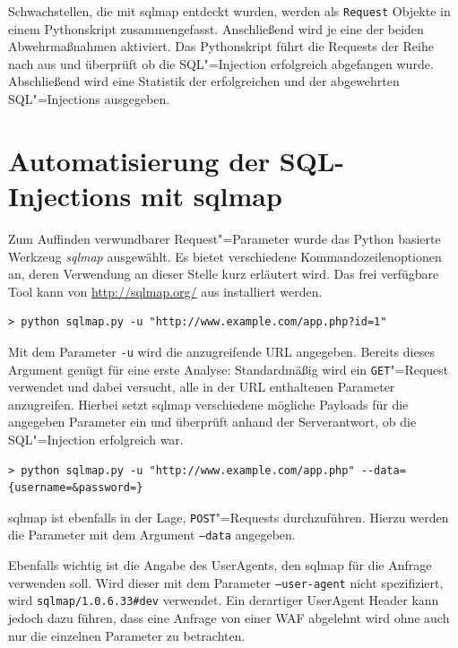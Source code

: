 Schwachstellen, die mit sqlmap entdeckt wurden, werden als \texttt{Request} Objekte in einem Pythonskript zusammengefasst. Anschließend wird je eine der beiden Abwehrmaßnahmen aktiviert. Das Pythonskript führt die Requests der Reihe nach aus und überprüft ob die SQL"=Injection erfolgreich abgefangen wurde. Abschließend wird eine Statistik der erfolgreichen und der abgewehrten SQL"=Injections ausgegeben.


\section{Automatisierung der SQL-Injections mit sqlmap}

Zum Auffinden verwundbarer Request"=Parameter wurde das Python basierte Werkzeug \emph{sqlmap} ausgewählt. Es bietet verschiedene Kommandozeilenoptionen an, deren Verwendung an dieser Stelle kurz erläutert wird. Das frei verfügbare Tool kann von \url{http://sqlmap.org/} aus installiert werden.

\begin{listing}
\begin{verbatim}
> python sqlmap.py -u "http://www.example.com/app.php?id=1"
\end{verbatim}
\end{listing}

Mit dem Parameter \texttt{-u} wird die anzugreifende URL angegeben. Bereits dieses Argument genügt für eine erste Analyse: Standardmäßig wird ein \texttt{GET}"=Request verwendet und dabei versucht, alle in der URL enthaltenen Parameter anzugreifen. Hierbei setzt sqlmap verschiedene mögliche Payloads für die angegeben Parameter ein und überprüft anhand der Serverantwort, ob die SQL"=Injection erfolgreich war.

\begin{listing}
\begin{verbatim}
> python sqlmap.py -u "http://www.example.com/app.php" --data={username=&password=}
\end{verbatim}
\end{listing}

sqlmap ist ebenfalls in der Lage, \texttt{POST}"=Requests durchzuführen. Hierzu werden die Parameter mit dem Argument \texttt{--data} angegeben.

Ebenfalls wichtig ist die Angabe des UserAgents, den sqlmap für die Anfrage verwenden soll. Wird dieser mit dem Parameter \texttt{--user-agent} nicht spezifiziert, wird \texttt{sqlmap/1.0.6.33\#dev} verwendet. Ein derartiger UserAgent Header kann jedoch dazu führen, dass eine Anfrage von einer WAF abgelehnt wird ohne auch nur die einzelnen Parameter zu betrachten.



